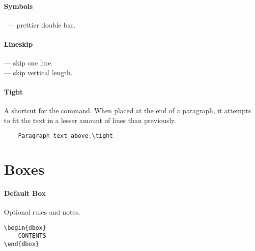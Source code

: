 \documentclass[itdr]{subfiles}
\begin{document}
\paragraph{Symbols}
\fbox{\lstinline!\\dbar!} \dbar~--- prettier double bar.

\paragraph{Lineskip}
\fbox{\lstinline!\\lineskip!} --- skip one line.\\
\fbox{\lstinline!\\lineskip[length]!} --- skip vertical length.

\paragraph{Tight}
\vspace{-0.5\baselineskip}
A shortcut for the  command. When placed at the end of a paragraph, it attempts to fit the text in a lesser amount of lines than previously.\tight

\begin{lstlisting}
	Paragraph text above.\tight 
\end{lstlisting}
\vspace{-2\baselineskip}\faHandPointUp

\break

\section{Boxes}

\begin{dbox}
	\paragraph{Default Box}
	Optional rules and notes.\\
	\lipsum[66]
\end{dbox}

\skipline[0.25\baselineskip]

\begin{lstlisting}
\begin{dbox}
	CONTENTS
\end{dbox}
\end{lstlisting}

\vfill
\end{document}
